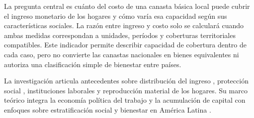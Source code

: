 La pregunta central es cuánto del costo de una canasta básica local puede cubrir el ingreso monetario de los hogares y cómo varía esa capacidad según sus características sociales. La razón entre ingreso y costo solo se calculará cuando ambas medidas correspondan a unidades, períodos y coberturas territoriales compatibles. Este indicador permite describir capacidad de cobertura dentro de cada caso, pero no convierte las canastas nacionales en bienes equivalentes ni autoriza una clasificación simple de bienestar entre países.

La investigación articula antecedentes sobre distribución del ingreso \parencite{ResumenResultadosCASEN2023}, protección social \parencite{Stampinietal2025, Carrere2026}, instituciones laborales \parencite{BarreraInsuaNoguera2026, DuranS2026} y reproducción material de los hogares. Su marco teórico integra la economía política del trabajo y la acumulación de capital \parencite{DuranSilva2022, MarxElCapital2008} con enfoques sobre estratificación social y bienestar en América Latina \parencite{cepalPanoramaSocialAmerica2025, CostaRibeiroCarcalhaes2024}.